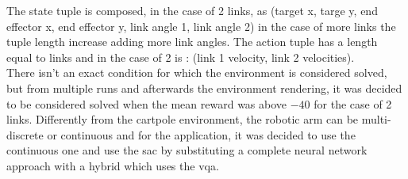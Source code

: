 The state tuple is composed, in the case of 2 links, as (target x, targe y, end effector x, end effector y, link angle 1, link angle 2) in the case of more links the tuple length increase adding more link angles. The action tuple has a length equal to links and in the case of 2 is : (link 1 velocity, link 2 velocities).\\
There isn't an exact condition for which the environment is considered solved, but from multiple runs and afterwards the environment rendering, it was decided to be considered solved when the mean reward was above $-40$ for the case of 2 links.
Differently from the cartpole environment, the robotic arm can be multi-discrete or continuous and for the application, it was decided to use the continuous one and use the \acrfull{sac} by substituting a complete neural network approach with a hybrid which uses the \acrshort{vqa}.
